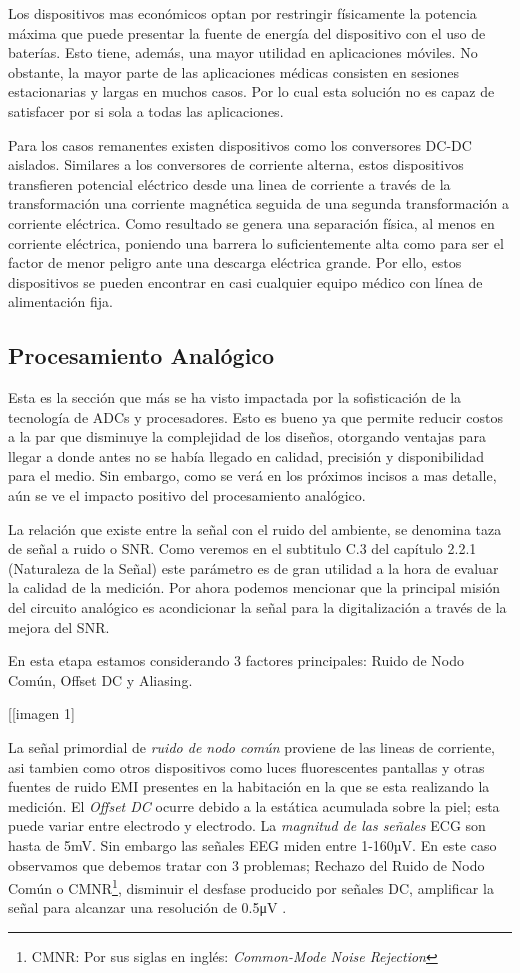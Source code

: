 Los dispositivos mas económicos optan por restringir físicamente la potencia máxima que puede presentar la fuente de energía del dispositivo con el uso de baterías. Esto tiene, además, una mayor utilidad en aplicaciones móviles. No obstante, la mayor parte de las aplicaciones médicas consisten en sesiones estacionarias y largas en muchos casos. Por lo cual esta solución no es capaz de satisfacer por si sola a todas las aplicaciones.

Para los casos remanentes existen dispositivos como los conversores DC-DC aislados. Similares a los conversores de corriente alterna, estos dispositivos transfieren potencial eléctrico desde una linea de corriente a través de la transformación una corriente magnética seguida de una segunda transformación a corriente eléctrica. Como resultado se genera una separación física, al menos en corriente eléctrica, poniendo una barrera lo suficientemente alta como para ser el factor de menor peligro ante una descarga eléctrica grande. Por ello, estos dispositivos se pueden encontrar en casi cualquier equipo médico con línea de alimentación fija.

\subsection{Procesamiento Analógico}
\label{sec:orgdc6269d}
Esta es la sección que más se ha visto impactada por la sofisticación de la tecnología de ADCs y procesadores. Esto es bueno ya que permite reducir costos a la par que disminuye la complejidad de los diseños, otorgando ventajas para llegar a donde antes no se había llegado en calidad, precisión y disponibilidad para el medio. Sin embargo, como se verá en los próximos incisos a mas detalle, aún se ve el impacto positivo del procesamiento analógico.

La relación que existe entre la señal con el ruido del ambiente, se denomina taza de señal a ruido o SNR. Como veremos en el subtitulo C.3 del capítulo 2.2.1 (Naturaleza de la Señal) este parámetro es de gran utilidad a la hora de evaluar la calidad de la medición. Por ahora podemos mencionar que la principal misión del circuito analógico es acondicionar la señal para la digitalización a través de la mejora del SNR.

En esta etapa estamos considerando 3 factores principales: Ruido de Nodo Común, Offset DC y Aliasing.

[[imagen 1]

La señal primordial de \emph{ruido de nodo común} proviene de las lineas de corriente, asi tambien como otros dispositivos como luces fluorescentes pantallas y otras fuentes de ruido EMI presentes en la habitación en la que se esta realizando la medición. El \emph{Offset DC} ocurre debido a la estática acumulada sobre la piel; esta puede variar entre electrodo y electrodo. La \emph{magnitud de las señales} ECG son hasta de 5mV. Sin embargo las señales EEG miden entre 1-160µV. En este caso observamos que debemos tratar con 3 problemas; Rechazo del Ruido de Nodo Común o CMNR\footnote{CMNR: Por sus siglas en inglés: \emph{Common-Mode Noise Rejection}}, disminuir el desfase producido por señales DC, amplificar la señal para alcanzar una resolución de 0.5μV \cite{IFCN1999a}.

